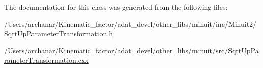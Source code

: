 The documentation for this class was generated from the following files\+:\begin{DoxyCompactItemize}
\item 
/\+Users/archanar/\+Kinematic\+\_\+factor/adat\+\_\+devel/other\+\_\+libs/minuit/inc/\+Minuit2/\mbox{\hyperlink{other__libs_2minuit_2inc_2Minuit2_2SqrtUpParameterTransformation_8h}{Sqrt\+Up\+Parameter\+Transformation.\+h}}\item 
/\+Users/archanar/\+Kinematic\+\_\+factor/adat\+\_\+devel/other\+\_\+libs/minuit/src/\mbox{\hyperlink{SqrtUpParameterTransformation_8cxx}{Sqrt\+Up\+Parameter\+Transformation.\+cxx}}\end{DoxyCompactItemize}
